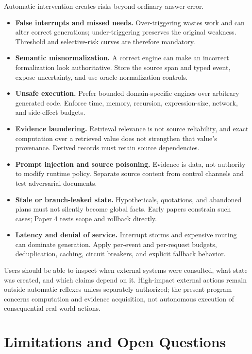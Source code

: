 \documentclass[11pt]{article}
\begin{document}
Automatic intervention creates risks beyond ordinary answer error.
\begin{itemize}
  \item \textbf{False interrupts and missed needs.} Over-triggering wastes work
  and can alter correct generations; under-triggering preserves the original
  weakness.  Threshold and selective-risk curves are therefore mandatory.
  \item \textbf{Semantic misnormalization.} A correct engine can make an
  incorrect formalization look authoritative.  Store the source span and typed
  event, expose uncertainty, and use oracle-normalization controls.
  \item \textbf{Unsafe execution.} Prefer bounded domain-specific engines over
  arbitrary generated code.  Enforce time, memory, recursion, expression-size,
  network, and side-effect budgets.
  \item \textbf{Evidence laundering.} Retrieval relevance is not source
  reliability, and exact computation over a retrieved value does not strengthen
  that value's provenance.  Derived records must retain source dependencies.
  \item \textbf{Prompt injection and source poisoning.} Evidence is data, not
  authority to modify runtime policy.  Separate source content from control
  channels and test adversarial documents.
  \item \textbf{Stale or branch-leaked state.} Hypotheticals, quotations, and
  abandoned plans must not silently become global facts.  Early papers constrain
  such cases; Paper 4 tests scope and rollback directly.
  \item \textbf{Latency and denial of service.} Interrupt storms and expensive
  routing can dominate generation.  Apply per-event and per-request budgets,
  deduplication, caching, circuit breakers, and explicit fallback behavior.
\end{itemize}

Users should be able to inspect when external systems were consulted, what
state was created, and which claims depend on it.  High-impact external actions
remain outside automatic reflexes unless separately authorized; the present
program concerns computation and evidence acquisition, not autonomous execution
of consequential real-world actions.

\section{Limitations and Open Questions}
\end{document}
